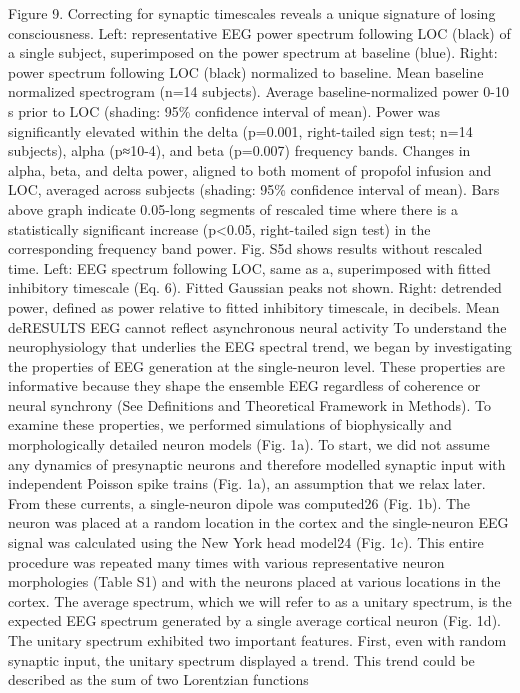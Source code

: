 Figure 9. Correcting for synaptic timescales reveals a unique signature of losing consciousness.
	Left: representative EEG power spectrum following LOC (black) of a single subject, superimposed on the power spectrum at baseline (blue). Right: power spectrum following LOC (black) normalized to baseline. 
	Mean baseline normalized spectrogram (n=14 subjects).
	Average baseline-normalized power 0-10 s prior to LOC (shading: 95\% confidence interval of mean). Power was significantly elevated within the delta (p=0.001, right-tailed sign test; n=14 subjects), alpha (p≈10-4), and beta (p=0.007) frequency bands.
	Changes in alpha, beta, and delta power, aligned to both moment of propofol infusion and LOC, averaged across subjects (shading: 95\% confidence interval of mean). Bars above graph indicate 0.05-long segments of rescaled time where there is a statistically significant increase (p<0.05, right-tailed sign test) in the corresponding frequency band power. Fig. S5d shows results without rescaled time. 
	Left: EEG spectrum following LOC, same as a, superimposed with fitted inhibitory timescale (Eq. 6). Fitted Gaussian peaks not shown. Right: detrended power, defined as power relative to fitted inhibitory timescale, in decibels. 
	Mean deRESULTS
EEG cannot reflect asynchronous neural activity
To understand the neurophysiology that underlies the EEG spectral trend, we began by investigating the properties of EEG generation at the single-neuron level. These properties are informative because they shape the ensemble EEG regardless of coherence or neural synchrony (See Definitions and Theoretical Framework in Methods). To examine these properties, we performed simulations of biophysically and morphologically detailed neuron models (Fig. 1a). To start, we did not assume any dynamics of presynaptic neurons and therefore modelled synaptic input with independent Poisson spike trains (Fig. 1a), an assumption that we relax later. From these currents, a single-neuron dipole was computed26 (Fig. 1b). The neuron was placed at a random location in the cortex and the single-neuron EEG signal was calculated using the New York head model24 (Fig. 1c). This entire procedure was repeated many times with various representative neuron morphologies (Table S1) and with the neurons placed at various locations in the cortex. The average spectrum, which we will refer to as a unitary spectrum, is the expected EEG spectrum generated by a single average cortical neuron (Fig. 1d). 
	The unitary spectrum exhibited two important features. First, even with random synaptic input, the unitary spectrum displayed a trend. This trend could be described as the sum of two Lorentzian functions

